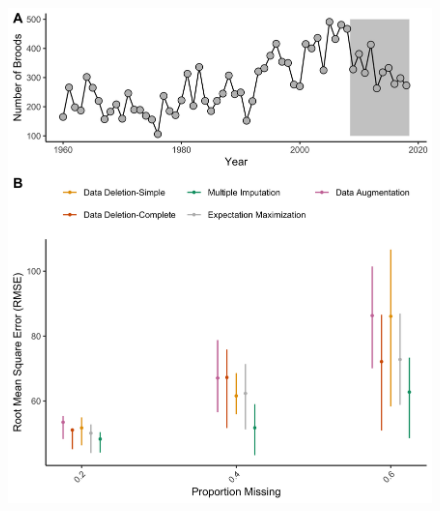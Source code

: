 \documentclass[12pt,english]{article} %
\begin{document}
\begin{linenumbers}
\begin{spacing}{1.9}
\begin{flushleft}
\begin{figure}
    \noindent\includegraphics[width = \textwidth]{Figures/MockedUpFigures/RMSE_pois_combined.png}
    \caption{}
    \label{fig:RMSE_Poiss}
\end{figure}
\clearpage

%

\end{flushleft}
\end{spacing}
\end{linenumbers}
\end{document}
